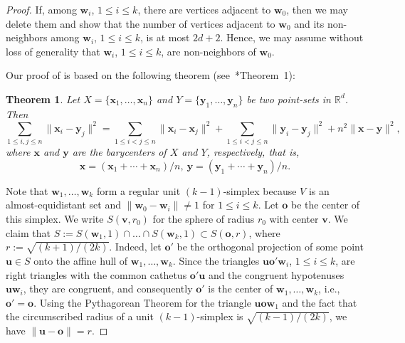\documentclass[a4paper, oneside, reqno, 12pt]{amsart}
\theoremstyle{plain}
\newtheorem{theorem}{Theorem}
\theoremstyle{definition}
\begin{document}
\begin{proof}
	If, among $\mathbf w_i$, $1\leq i \leq k$, there are vertices adjacent to $\mathbf w_0$, then we may delete them and show that the number of vertices adjacent to $\mathbf w_0$ and its non-neighbors among $\mathbf w_i$, $1\leq i\leq k$, is at most $2d + 2$. Hence, we may assume without loss of generality that $\mathbf w_i$, $1\leq i \leq k$, are non-neighbors of $\mathbf w_0$.
		

 Our proof of  is based on the following theorem (see~\cite{DM94}*{Theorem~1}):
\begin{theorem}\label{theorem:centermass}
 Let $X = \{\mathbf x_1,\dots, \mathbf x_n\}$ and $Y = \{\mathbf y_1, \dots, \mathbf y_n\}$ be two point-sets in $\mathbb R^d$. Then 
\[
\sum_{1\leq i,j\leq n} \|\mathbf x_i-\mathbf y_j\|^2 = \sum_{1\leq i<j\leq n} \|\mathbf x_i - \mathbf x_j\|^2 + \sum_{1\leq i< j\leq n}\|\mathbf y_i- \mathbf y_j\|^2 + n^2\|\mathbf x -\mathbf y\|^2,
\]
where $\mathbf x$ and $\mathbf y$ are the barycenters of $X$ and $Y$, respectively, that is, 
\[
\mathbf x =(\mathbf x_1 + \cdots + \mathbf x_n)/n,\ \mathbf y = (\mathbf y_1 + \cdots +\mathbf y_n)/n. 
\]
\end{theorem}
Note that $\mathbf w_1, \dots, \mathbf w_k$ form a regular unit $(k-1)$-simplex because $V$ is an almost-equidistant set and $\|\mathbf w_0-\mathbf w_i\|\ne 1$ for $1\leq i\leq k$. Let $\mathbf o$ be the center of this simplex. We write $S(\mathbf v, r_0)$ for the sphere of radius $r_0$ with center $\mathbf v$. We claim that $S:=S(\mathbf w_1, 1) \cap \dots\cap S(\mathbf w_k, 1)\subset S(\mathbf o, r)$, where $r:= \sqrt{(k+1)/(2k)}$. Indeed, let  $\mathbf o'$ be the orthogonal projection of some point $\mathbf u\in S$ onto the affine hull of $\mathbf w_1,\dots, \mathbf w_k$. Since the triangles $\mathbf u \mathbf o'\mathbf w_i$, $1\leq i\leq k$, are right triangles with the common cathetus $\mathbf o'\mathbf u$ and the congruent hypotenuses $\mathbf u\mathbf w_i$, they are congruent, and consequently $\mathbf o'$ is the center of $\mathbf w_1, \dots, \mathbf w_k$, i.e., $\mathbf o'=\mathbf o$. Using the Pythagorean Theorem for the triangle $\mathbf u\mathbf o\mathbf w_1$ and the fact that the circumscribed radius of a unit $(k-1)$-simplex is $\sqrt{(k-1)/(2k)}$, we have $\|\mathbf u-\mathbf o\|=r$. 


\end{proof}
\end{document}
